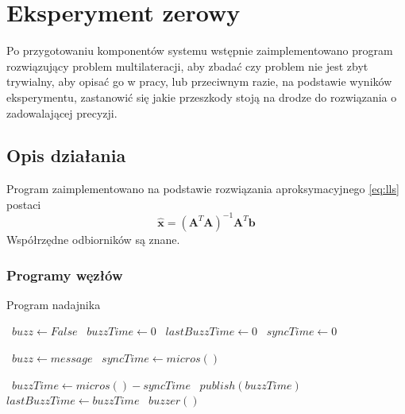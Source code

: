 \chapter{Eksperyment zerowy}\label{chap:experiment_zero}

Po przygotowaniu komponentów systemu wstępnie zaimplementowano program rozwiązujący problem multilateracji, aby zbadać czy problem nie jest zbyt trywialny, aby opisać go w pracy, lub przeciwnym razie, na podstawie wyników eksperymentu, zastanowić się jakie przeszkody stoją na drodze do rozwiązania o zadowalającej precyzji.

\section{Opis działania}

Program zaimplementowano na podstawie rozwiązania aproksymacyjnego \ref{eq:lls} postaci
\begin{equation}
    \hat{\mathbf{x}} = {\left(\mathbf{A}^T\mathbf{A}\right)}^{-1}\mathbf{A}^T\mathbf{b}
\end{equation}
Współrzędne odbiorników są znane.

\subsection{Programy węzłów}

\begin{algorithm}
\caption{Program nadajnika}\label{alg:source}
\begin{algorithmic}[1]
    \State\ $buzz \gets False$
    \State\ $buzzTime \gets 0$
    \State\ $lastBuzzTime \gets 0$
    \State\ $syncTime \gets 0$

            \State\ $buzz \gets message$
        \EndIf
            \State\ $syncTime \gets micros()$
        \EndIf
    \EndFunction

    \Loop
            \State\ $buzzTime \gets micros() - syncTime$
            \State\ $publish(buzzTime)$
            \State\ $lastBuzzTime \gets buzzTime$
            \State\ $buzzer()$
        \EndIf
    \EndLoop
\end{algorithmic}
\end{algorithm}

